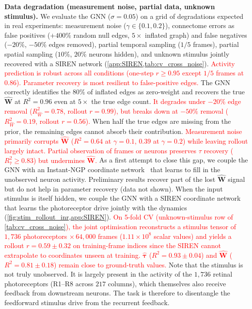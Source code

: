 \documentclass{article}
\begin{document}
\textbf{Data degradation (measurement noise, partial data, unknown stimulus).}\label{sec:degradation}
We evaluate the GNN ($\sigma=0.05$) on a grid of degradations expected in real experiments: measurement noise ($\gamma\in\{0.1,0.2\}$), connectome errors as false positives ($+400\%$ random null edges, $5\times$ inflated graph) and false negatives ($-20\%$, $-50\%$ edges removed), partial temporal sampling ($1/5$ frames), partial spatial sampling ($10\%$, $20\%$ neurons hidden), and unknown stimulus jointly recovered with a SIREN network (\cref{app:SIREN,tab:cv_cross_noise}). \textcolor{red}{Activity prediction is robust across all conditions (one-step $r\geq0.95$ except $1/5$ frames at $0.86$).} \textcolor{red}{Parameter recovery is most resilient to false-positive edges.} The GNN correctly identifies the $80\%$ of inflated edges as zero-weight and recovers the true $\hat{\mathbf{W}}$ at $R^2=0.96$ even at $5\times$ the true edge count. \textcolor{red}{It degrades under $-20\%$ edge removal ($R^2_{\hat{W}}=0.78$, rollout $r=0.99$), but breaks down at $-50\%$ removal ($R^2_{\hat{W}}=0.19$, rollout $r=0.56$).} When half the true edges are missing from the prior, the remaining edges cannot absorb their contribution. \textcolor{red}{Measurement noise primarily corrupts $\hat{\mathbf{W}}$ ($R^2=0.64$ at $\gamma=0.1$, $0.39$ at $\gamma=0.2$) while leaving rollout largely intact.} \textcolor{red}{Partial observation of frames or neurons preserves $\tau$ recovery ($R^2_{\hat\tau}\geq0.83$) but undermines $\hat{\mathbf{W}}$.} As a first attempt to close this gap, we couple the GNN with an Instant\nobreakdash-NGP coordinate network~\citep{muller_instant_2022} that learns to fill in the unobserved neuron activity. Preliminary results recover part of the lost $\hat{\mathbf{W}}$ signal but do not help in parameter recovery (data not shown). When the input stimulus is itself hidden, we couple the GNN with a SIREN coordinate network~\citep{sitzmann_implicit_2020} that learns the photoreceptor drive jointly with the dynamics (\cref{fig:stim_rollout_inr,app:SIREN}). \textcolor{red}{On 5-fold CV (unknown-stimulus row of \cref{tab:cv_cross_noise}), the joint optimisation reconstructs a stimulus tensor of $1{,}736$ photoreceptors $\times\,64{,}000$ frames ($1.11\!\times\!10^{8}$ scalar values) and yields a rollout $r=0.59\pm 0.32$ on training-frame indices since the SIREN cannot extrapolate to coordinates unseen at training.} \textcolor{red}{$\hat{\boldsymbol{\tau}}$ ($R^2=0.93\pm 0.04$) and $\hat{\mathbf{W}}$ ($R^2=0.81\pm 0.18$) remain close to ground-truth values.} Note that the stimulus is not truly unobserved. It is largely present in the activity of the $1{,}736$ retinal photoreceptors (R1--R8 across $217$ columns), which themselves also receive feedback from downstream neurons. The task is therefore to disentangle the feedforward stimulus drive from the recurrent feedback.
\end{document}
